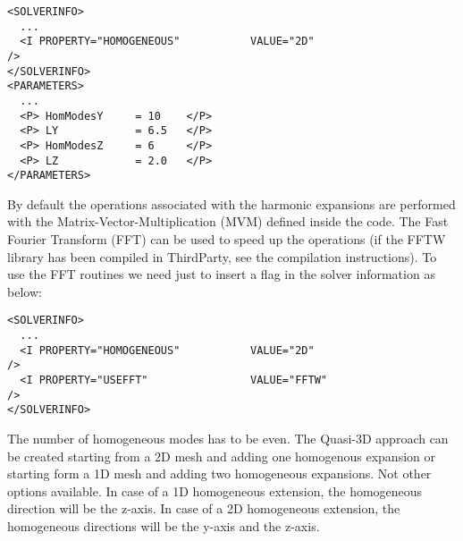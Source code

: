 \begin{lstlisting}[style=XMLStyle]
<SOLVERINFO>
  ...
  <I PROPERTY="HOMOGENEOUS"           VALUE="2D"                         />
</SOLVERINFO>
<PARAMETERS>
  ...
  <P> HomModesY     = 10    </P>
  <P> LY            = 6.5   </P>
  <P> HomModesZ     = 6     </P>
  <P> LZ            = 2.0   </P>
</PARAMETERS>
\end{lstlisting}

By default the operations associated with the harmonic expansions are performed
with the Matrix-Vector-Multiplication (MVM) defined inside the code. The Fast
Fourier Transform (FFT) can be used to speed up the operations (if the FFTW
library has been compiled in ThirdParty, see the compilation instructions). To
use the FFT routines we need just to insert a flag in the solver information as
below:

\begin{lstlisting}[style=XMLStyle]
<SOLVERINFO>
  ...
  <I PROPERTY="HOMOGENEOUS"           VALUE="2D"                         />
  <I PROPERTY="USEFFT"                VALUE="FFTW"                       />
</SOLVERINFO>
\end{lstlisting}

The number of homogeneous modes has to be even. The Quasi-3D approach can be
created starting from a 2D mesh and adding one homogenous expansion or starting
form a 1D mesh and adding two homogeneous expansions. Not other options
available. In case of a 1D homogeneous extension, the homogeneous direction will
be the z-axis. In case of a 2D homogeneous extension, the homogeneous directions
will be the y-axis and the z-axis.

